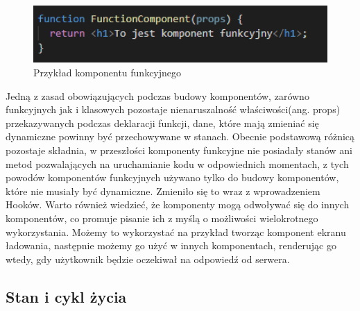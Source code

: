 \documentclass[oneside,polski,logo,indent]{amuthesis}
\begin{document}
\begin{enumerate}
\begin{enumerate}
{\begin{figure}[H]
\centering
\includegraphics[width=13cm]{komponent funkcyjny.png}
\caption{Przykład komponentu funkcyjnego
}
\label{komponent funkcyjny}
\end{figure}
Jedną z zasad obowiązujących podczas budowy komponentów, zarówno funkcyjnych jak i klasowych pozostaje nienaruszalność właściwości(ang. props) przekazywanych podczas deklaracji funkcji, dane, które mają zmieniać się dynamiczne powinny być przechowywane w stanach.
Obecnie podstawową różnicą pozostaje składnia, w przeszłości komponenty funkcyjne nie posiadały stanów ani metod pozwalających na uruchamianie kodu w odpowiednich momentach, z tych powodów komponentów funkcyjnych używano tylko do budowy komponentów, które nie musiały być dynamiczne. Zmieniło się to wraz z wprowadzeniem Hooków.
Warto również wiedzieć, że komponenty mogą odwoływać się do innych komponentów, co promuje pisanie ich z myślą o możliwości wielokrotnego wykorzystania. Możemy to wykorzystać na przykład tworząc komponent ekranu ładowania, następnie możemy go użyć w innych komponentach, renderując go wtedy, gdy użytkownik będzie oczekiwał na odpowiedź od serwera.



}

\subsection{Stan i cykl życia}{

}
\end{enumerate}
\end{enumerate}
\end{document}
